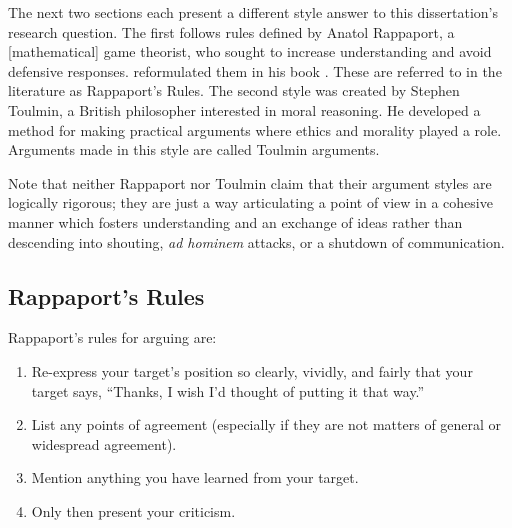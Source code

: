 The next two sections each present a different style answer to this dissertation's research question. The first follows rules defined by Anatol Rappaport, a [mathematical] game theorist, who sought to increase understanding and avoid defensive responses. \citeauthor{Dennett2013} reformulated them in his book  \parencite{Dennett2013}. These are referred to in the literature as Rappaport's Rules. The second style was created by Stephen Toulmin, a British philosopher interested in moral reasoning. He developed a method for making practical arguments where ethics and morality played a role. Arguments made in this style are called Toulmin arguments. %

Note that neither Rappaport nor Toulmin claim that their argument styles are logically rigorous; they are just a way articulating a point of view in a cohesive manner which fosters understanding and an exchange of ideas rather than descending into shouting, \textit{ad hominem} attacks, or a shutdown of communication.

\subsection{Rappaport's Rules}\label{sec:rappaports-rules}\indent

%
Rappaport's rules for arguing are:
\begin{enumerate}[topsep=0.3\baselineskip,itemsep=0.25\baselineskip]
  \item Re-express your target’s position so clearly, vividly, and fairly that your target says, “Thanks, I wish I’d thought of putting it that way.”
  \item List any points of agreement (especially if they are not matters of general or widespread agreement).
  \item Mention anything you have learned from your target.
  \item Only then present your criticism.
\end{enumerate}
\medskip

